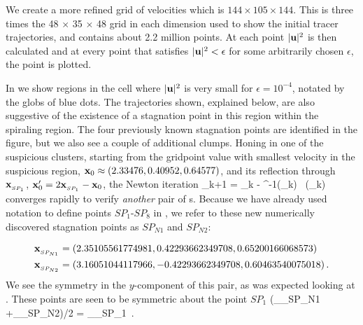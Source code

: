 \documentclass[letter,10pt,openany]{article}
\begin{document}
We create a more refined grid of velocities which
  is $144 \times 105 \times 144$. This is three times the 48 $\times$ 35
  $\times$ 48 grid in each dimension used to show the initial tracer trajectories, and contains about 2.2 million
  points. At each point $|{\bf u}|^{2}$ is then calculated and at
  every point that satisfies $|{\bf u}|^{2} < \epsilon$ for some
  arbitrarily chosen $\epsilon$, the point is plotted.

In  we show regions in the cell where $|{\bf u}|^{2}$ is very small for $\epsilon = 10^{-4}$, notated by the globs of blue dots. The trajectories shown, explained below, are also suggestive of the existence of a stagnation point in this region within the spiraling region. The four previously known stagnation points are identified in the figure, but we also see a couple of additional clumps. Honing in one of the suspicious clusters,
starting from the gridpoint value with smallest velocity in the suspicious region,
${\bf x}_{0} \approx (2.33476, 0.40952, 0.64577)$, and its reflection through
$\bold{x}_{_{SP_{1}}}$, ${\bf x}_{0}' =2 \bold{x}_{_{SP_{1}}} - {\bf x}_{0}$, the Newton iteration
 \beq
 \bx_{k+1} = \bx_{k} -
          {\Mvar}^{-1}(\bx_{k}) \, \bu(\bx_{k})
 \eeq
converges rapidly to verify \textit{another} pair of \stagp s. Because we have already used notation to define points $SP_1$-$SP_8$ in , we refer to these new numerically discovered stagnation points as $SP_{N1}$ and $SP_{N2}$: 

\begin{align}
&\bold{x}_{_{SP_{N1}}} =(2.35105561774981,0.42293662349708,0.65200166068573)
\\
&\bold{x}_{_{SP_{N2}}}=(3.16051044117966,-0.42293662349708,0.60463540075018)
\label{eqn:newspNewt}
\,.
\end{align}
We see the
 symmetry in the $y$-component of this pair, as was expected looking
 at .
These points are seen to be
 symmetric about the point $SP_1$
 \beq
    (_{_{SP_{N1}}} +_{_{SP_{N2}}})/2 = _{_{SP_{1}}}
 \,.
 \eeq

 
\end{document}
